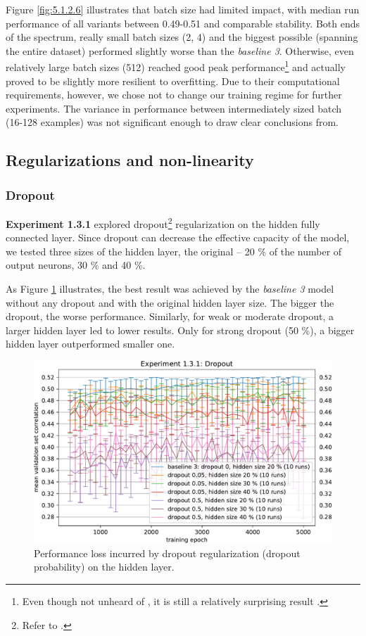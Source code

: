 Figure \ref{fig:5.1.2.6} illustrates that batch size had limited impact, with median run performance of all variants between 0.49-0.51 and comparable stability. Both ends of the spectrum, really small batch sizes (2, 4) and the biggest possible (spanning the entire dataset) performed slightly worse than the \textit{baseline 3}. Otherwise, even relatively large batch sizes (512) reached good peak performance\footnote{Even though not unheard of \citep{2017arXiv171100489S}, it is still a relatively surprising result \citep{2017arXiv170508741H}.} and actually proved to be slightly more resilient to overfitting. Due to their computational requirements, however, we chose not to change our training regime for further experiments. The variance in performance between intermediately sized batch (16-128 examples) was not significant enough to draw clear conclusions from.

\subsection{Regularizations and non-linearity}
\subsubsection{Dropout}

\textbf{Experiment 1.3.1} explored dropout\footnote{Refer to .} regularization on the hidden fully connected layer. Since dropout can decrease the effective capacity of the model, we tested three sizes of the hidden layer, the original -- 20 \% of the number of output neurons, 30 \% and 40 \%. 

As Figure \ref{fig:5.1.3.1} illustrates, the best result was achieved by the \textit{baseline 3} model without any dropout and with the original hidden layer size. The bigger the dropout, the worse performance. Similarly, for weak or moderate dropout, a larger hidden layer led to lower results. Only for strong dropout (50 \%), a bigger hidden layer outperformed smaller one.

\begin{figure}[H]
    \centering
    \includegraphics[width=1\textwidth]{../figures/05_1_3_1}
    \caption[Experiment 1.3.1]{Performance loss incurred by dropout regularization (dropout probability) on the hidden layer.}
    \label{fig:5.1.3.1}
\end{figure}

